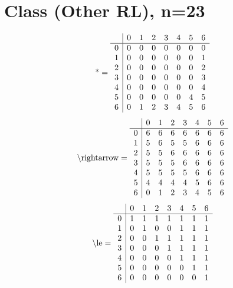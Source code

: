 \documentclass[11pt]{article}
\begin{document}
\section{Class (Other RL), n=23}
\[\text{*} = 
\begin{array}{r | r r r r r r r}
 & 0 & 1 & 2 & 3 & 4 & 5 & 6 \\ \hline
0 & 0 & 0 & 0 & 0 & 0 & 0 & 0 \\
1 & 0 & 0 & 0 & 0 & 0 & 0 & 1 \\
2 & 0 & 0 & 0 & 0 & 0 & 0 & 2 \\
3 & 0 & 0 & 0 & 0 & 0 & 0 & 3 \\
4 & 0 & 0 & 0 & 0 & 0 & 0 & 4 \\
5 & 0 & 0 & 0 & 0 & 0 & 4 & 5 \\
6 & 0 & 1 & 2 & 3 & 4 & 5 & 6 \\
\end{array}
\]
\[\text{\textbackslash rightarrow} = 
\begin{array}{r | r r r r r r r}
 & 0 & 1 & 2 & 3 & 4 & 5 & 6 \\ \hline
0 & 6 & 6 & 6 & 6 & 6 & 6 & 6 \\
1 & 5 & 6 & 5 & 5 & 6 & 6 & 6 \\
2 & 5 & 5 & 6 & 6 & 6 & 6 & 6 \\
3 & 5 & 5 & 5 & 6 & 6 & 6 & 6 \\
4 & 5 & 5 & 5 & 5 & 6 & 6 & 6 \\
5 & 4 & 4 & 4 & 4 & 5 & 6 & 6 \\
6 & 0 & 1 & 2 & 3 & 4 & 5 & 6 \\
\end{array}
\]
\[\text{\textbackslash le} = 
\begin{array}{r | r r r r r r r}
 & 0 & 1 & 2 & 3 & 4 & 5 & 6 \\ \hline
0 & 1 & 1 & 1 & 1 & 1 & 1 & 1 \\
1 & 0 & 1 & 0 & 0 & 1 & 1 & 1 \\
2 & 0 & 0 & 1 & 1 & 1 & 1 & 1 \\
3 & 0 & 0 & 0 & 1 & 1 & 1 & 1 \\
4 & 0 & 0 & 0 & 0 & 1 & 1 & 1 \\
5 & 0 & 0 & 0 & 0 & 0 & 1 & 1 \\
6 & 0 & 0 & 0 & 0 & 0 & 0 & 1 \\
\end{array}
\]
\end{document}
